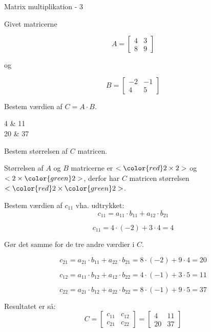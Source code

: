 \documentclass{article}
\begin{document}
\newpage

\begin{exercise}{Matrix multiplikation - 3}

Givet matricerne

\[
A = \left[\begin{array}{rr}
4 & 3 \\
8 & 9
\end{array} \right]
\]

og

\[
B = \left[\begin{array}{rr}
-2 & -1 \\
4 & 5
\end{array} \right]
\]

Bestem værdien af $C = A \cdot B$.

\begin{answermatrix}
4 & 11 \\
20 & 37
\end{answermatrix}

\hint
Bestem størrelsen af $C$ matricen.

\hint
Størrelsen af $A$ og $B$ matricerne er $<{\color{red} 2} \times 2>$ og $<2 \times {\color{green}2}>$,
derfor har $C$ matricen størrelsen $<{\color{red} 2} \times {\color{green}2}>$.

\hint
Bestem værdien af $c_{11}$ vha. udtrykket:
\[
c_{11} = a_{11} \cdot b_{11} + a_{12} \cdot b_{21}
\]

\hint
\[
c_{11} = 4 \cdot (-2) + 3 \cdot 4 = 4
\]

\hint
Gør det samme for de tre andre værdier i $C$.

\hint
\[
c_{21} = a_{21} \cdot b_{11} + a_{22} \cdot b_{21} = 8 \cdot (-2) + 9 \cdot 4 = 20
\]

\hint
\[
c_{12} = a_{11} \cdot b_{12} + a_{12} \cdot b_{22} = 4 \cdot (-1) + 3 \cdot 5 = 11
\]

\hint
\[
c_{22} = a_{21} \cdot b_{12} + a_{22} \cdot b_{22} = 8 \cdot (-1) + 9 \cdot 5 = 37
\]


\hint
Resultatet er så:
\[
C = \left[\begin{array}{rr}
c_{11} & c_{12} \\
c_{21} & c_{22}
\end{array} \right] =
\left[\begin{array}{rr}
4 & 11 \\
20 & 37
\end{array} \right]
\]


\end{exercise}
\end{document}
